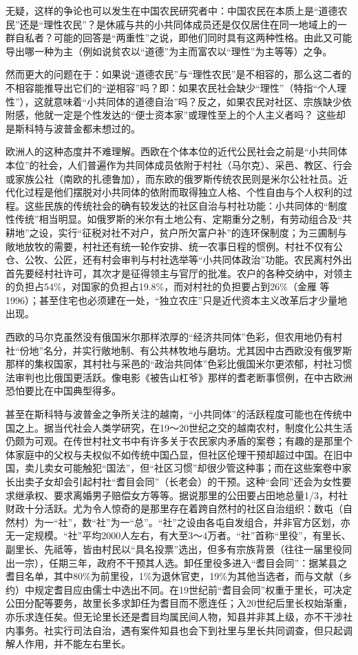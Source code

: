 \documentclass[a4paper,12pt,punct=kaiming]{ctexart}
\begin{document}
无疑，这样的争论也可以发生在中国农民研究者中：中国农民在本质上是“道德农民”还是“理性农民”？是休戚与共的小共同体成员还是仅仅居住在同一地域上的一群自私者？可能的回答是“两重性”之说，即他们同时具有这两种性格。由此又可能导出哪一种为主（例如说贫农以“道德”为主而富农以“理性”为主等等）之争。

然而更大的问题在于：如果说“道德农民”与“理性农民”是不相容的，那么这二者的不相容能推导出它们的“逆相容”吗？即：如果农民社会缺少“理性”（特指“个人理性”），这就意味着“小共同体的道德自治”吗？反之，如果农民对社区、宗族缺少依附感，他就一定是个性发达的“便士资本家”或理性至上的个人主义者吗？ 这些却是斯科特与波普金都未想过的。

欧洲人的这种态度并不难理解。西欧在个体本位的近代公民社会之前是“小共同体本位”的社会，人们普遍作为共同体成员依附于村社（马尔克）、采邑、教区、行会或家族公社（南欧的扎德鲁加），而东欧的俄罗斯传统农民则是米尔公社社员。近代化过程是他们摆脱对小共同体的依附而取得独立人格、个性自由与个人权利的过程。这些民族的传统社会的确有较发达的社区自治与村社功能：小共同体的“制度性传统”相当明显。如俄罗斯的米尔有土地公有、定期重分之制，有劳动组合及“共耕地”之设，实行“征税对社不对户，贫户所欠富户补”的连环保制度；为三圃制与敞地放牧的需要，村社还有统一轮作安排、统一农事日程的惯例。村社不仅有公仓、公牧、公匠，还有村会审判与村社选举等“小共同体政治”功能。农民离村外出首先要经村社许可，其次才是征得领主与官厅的批准。农户的各种交纳中，对领主的负担占54\%，对国家的负担占19.8\%，而对村社的负担要占到26\%（金雁 等 1996）；甚至住宅也必须建在一处，“独立农庄”只是近代资本主义改革后才少量地出现。

西欧的马尔克虽然没有俄国米尔那样浓厚的“经济共同体”色彩，但农用地仍有村社“份地”名分，并实行敞地制、有公共林牧地与磨坊。尤其因中古西欧没有俄罗斯那样的集权国家，其村社与采邑的“政治共同体”色彩比俄国米尔更浓郁，村社习惯法审判也比俄国更活跃。像电影《被告山杠爷》那样的耆老断事惯例，在中古欧洲恐怕要比在中国典型得多。

甚至在斯科特与波普金之争所关注的越南，“小共同体”的活跃程度可能也在传统中国之上。据当代社会人类学研究，在19～20世纪之交的越南农村，制度化公共生活仍颇为可观。在传世村社文书中有许多关于农民家内矛盾的案卷；有趣的是那里个体家庭中的父权与夫权似不如传统中国凸显，但社区伦理干预却超过中国。在旧中国，卖儿卖女可能触犯“国法”，但“社区习惯”却很少管这种事；而在这些案卷中家长出卖子女却会引起村社“耆目会同”（长老会）的干预。这种“会同”还会为女性要求继承权、要求离婚男子赔偿女方等等。据说那里的公田要占田地总量1/3，村社财政十分活跃。尤为令人惊奇的是那里存在着跨自然村的社区自治组织：数屯（自然村）为一“社”，数“社”为一“总”。“社”之设由各屯自发组合，并非官方区划，亦无一定规模。“社”平均2000人左右，有大至3～4万者。“社”首称“里役”，有里长、副里长、先祗等，皆由村民以“具名投票”选出，但多有宗族背景（往往一届里役同出一宗），任期三年，政府不干预其人选。卸任里役多进入“耆目会同”：据某县之耆目名单，其中80\%为前里役，1\%为退休官吏，19\%为其他当选者，而与文献（乡约）中规定耆目应由儒士中选出不同。在19世纪前“耆目会同”权重于里长，可决定公田分配等要务，故里长多求卸任为耆目而不愿连任；入20世纪后里长权始渐重，亦乐求连任矣。但无论里长还是耆目均属民间人物，知县并非其上级，亦不干涉社内事务。社实行司法自治，遇有案件知县也会下到社里与里长共同调查，但只起调解人作用，并不能左右里长。
\end{document}
